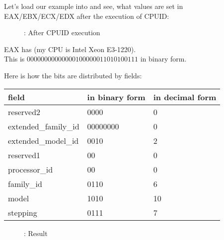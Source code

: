 ﻿\clearpage
{}
\myindex{\olly}

Let's load our example into \olly 
and see, what values are set in EAX/EBX/ECX/EDX after the execution of CPUID: 

\begin{figure}[H]
\centering
{}
\caption{\olly: After CPUID execution}
\label{fig:cpuid_olly_1}
\end{figure}

EAX has  (my \ac{CPU} is Intel Xeon E3-1220).\\
This is $0000 0000 0000 0010 0000 0110 1010 0111$ in binary form.

Here is how the bits are distributed by fields:

\begin{center}
\begin{tabular}{ | l | l | l | }
\hline
\headercolor{} field &
\headercolor{} in binary form &
\headercolor{} in decimal form \\
\hline
reserved2		& 0000 & 0 \\
\hline
extended\_family\_id	& 00000000 & 0 \\
\hline
extended\_model\_id	& 0010 & 2 \\
\hline
reserved1		& 00 & 0 \\
\hline
processor\_id		& 00 & 0 \\
\hline
family\_id		& 0110 & 6 \\
\hline
model			& 1010 & 10 \\
\hline
stepping		& 0111 & 7 \\
\hline
\end{tabular}
\end{center}

\begin{figure}[H]
\centering
{}
\caption{\olly: Result}
\label{fig:cpuid_olly_2}
\end{figure}
